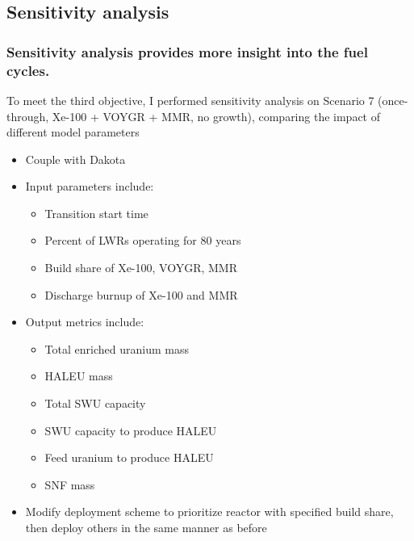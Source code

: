 \subsection{Sensitivity analysis}
\begin{frame}
    \frametitle{Sensitivity analysis provides more insight into 
    the fuel cycles.}
    To meet the third objective, I performed sensitivity analysis 
    on Scenario 7 (once-through, Xe-100 + VOYGR + MMR, no growth), 
    comparing the impact of different model parameters
    \begin{itemize}
        \item Couple \Cyclus with Dakota \cite{adams_dakota_2021}
        \item<2-> Input parameters include:
        \begin{itemize}
            \item<2-> Transition start time
            \item<2-> Percent of \glspl{LWR} operating for 80 years
            \item<2-> Build share of Xe-100, VOYGR, MMR
            \item<2-> Discharge burnup of Xe-100 and MMR
        \end{itemize}
        \item<3-> Output metrics include:
        \begin{itemize}
            \item<3-> Total enriched uranium mass
            \item<3-> HALEU mass
            \item<3-> Total SWU capacity
            \item<3-> SWU capacity to produce HALEU
            \item<3-> Feed uranium to produce HALEU
            \item<3-> \gls{SNF} mass
        \end{itemize}
        \item<4-> Modify deployment scheme to prioritize reactor with 
              specified build share, then deploy others in the same 
              manner as before
    \end{itemize}

\end{frame}

